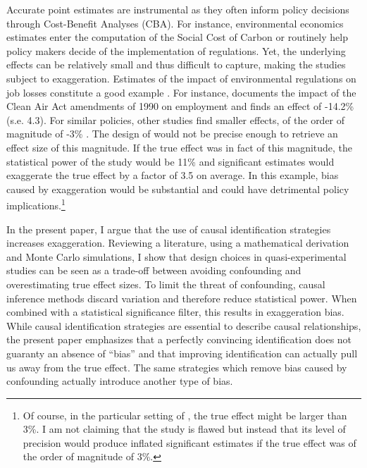 			 Accurate point estimates are instrumental as they often inform policy decisions through Cost-Benefit Analyses (CBA). For instance, environmental economics estimates enter the computation of the Social Cost of Carbon or routinely help policy makers decide of the implementation of regulations. Yet, the underlying effects can be relatively small and thus difficult to capture, making the studies subject to exaggeration. Estimates of the impact of environmental regulations on job losses constitute a good example \citep{gray_environmental_2023}. For instance, \cite{walker_environmental_2011} documents the impact of the Clean Air Act amendments of 1990 on employment and finds an effect of -14.2\% (s.e. 4.3). For similar policies, other studies find smaller effects, of the order of magnitude of -3\% \citep{greenstone_impacts_2002, gray_environmental_2023}. The design of \cite{walker_environmental_2011} would not be precise enough to retrieve an effect size of this magnitude. If the true effect was in fact of this magnitude, the statistical power of the study would be 11\% and significant estimates would exaggerate the true effect by a factor of 3.5 on average. In this example, bias caused by exaggeration would be substantial and could have detrimental policy implications.\footnote{Of course, in the particular setting of \cite{walker_environmental_2011}, the true effect might be larger than 3\%. I am not claiming that the study is flawed but instead that its level of precision would produce inflated significant estimates if the true effect was of the order of magnitude of 3\%.}
			
			In the present paper, I argue that the use of causal identification strategies increases exaggeration. %
			Reviewing a literature, using a mathematical derivation and Monte Carlo simulations, I show that design choices in quasi-experimental studies can be seen as a trade-off between avoiding confounding and overestimating true effect sizes. To limit the threat of confounding, causal inference methods discard variation and therefore reduce statistical power. When combined with a statistical significance filter, this results in exaggeration bias. While causal identification strategies are essential to describe causal relationships, the present paper emphasizes that a perfectly convincing identification does not guaranty an absence of ``bias'' and that improving identification can actually pull us away from the true effect. The same strategies which remove bias caused by confounding actually introduce another type of bias. 
			
